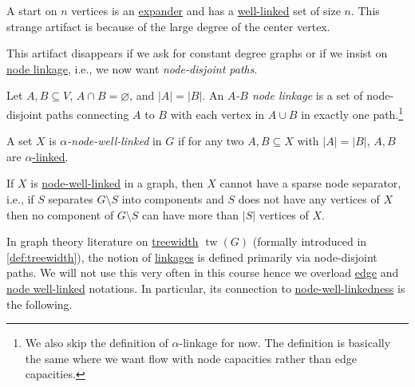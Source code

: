 \begin{eg}[Star]
	A start on \(n\) vertices is an \hyperref[def:expander]{expander} and has a \hyperref[def:well-linked]{well-linked} set of size \(n\). This strange artifact is because of the large degree of the center vertex.
\end{eg}

This artifact disappears if we ask for constant degree graphs or if we insist on \hyperref[def:node-linkage]{node linkage}, i.e., we now want \emph{node-disjoint paths}.

\begin{definition}\label{def:node-linkage}
	Let \(A, B \subseteq V\), \(A \cap B = \varnothing \), and \(\lvert A \rvert = \lvert B \rvert \). An \emph{\(A\)-\(B\) node linkage} is a set of node-disjoint paths connecting \(A\) to \(B\) with each vertex in \(A \cup B\) in exactly one path.\footnote{We also skip the definition of \(\alpha \)-linkage for now. The definition is basically the same where we want flow with node capacities rather than edge capacities.}
\end{definition}

\begin{definition}\label{def:node-well-linked}
	A set \(X\) is \emph{\(\alpha \)-node-well-linked} in \(G\) if for any two \(A, B \subseteq X\) with \(\lvert A \rvert = \lvert B \rvert \), \(A, B\) are \hyperref[def:node-linkage]{\(\alpha \)-linked}.
\end{definition}

\begin{intuition}
	If \(X\) is \hyperref[def:node-well-linked]{node-well-linked} in a graph, then \(X\) cannot have a sparse node separator, i.e., if \(S\) separates \(G\setminus S\)  	into components and \(S\) does not have any vertices of \(X\) then no component of \(G\setminus S\) can have more than \(\lvert S \rvert \) vertices of \(X\).
\end{intuition}

In graph theory literature on \href{https://en.wikipedia.org/wiki/Treewidth}{treewidth} \(\operatorname{tw}(G)\)  (formally introduced in \autoref{def:treewidth}), the notion of \hyperref[def:linkage]{linkages} is defined primarily via node-disjoint paths. We will not use this very often in this course hence we overload \hyperref[def:linkage]{edge} and \hyperref[def:node-well-linked]{node well-linked} notations. In particular, its connection to \hyperref[def:node-well-linked]{node-well-linkedness} is the following.

